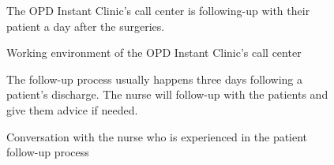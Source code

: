 \documentclass[12pt,oneside,openright,a4paper]{cpe-english-project}
\begin{document}
      \begin{figure}[!h]
        \centering
        \caption{Working environment of the OPD Instant Clinic's call center}\label{fig:Interview_2}
        \begin{flushleft}
          \qquad The OPD Instant Clinic's call center is following-up with their patient a day after the surgeries. \par
        \end{flushleft}
      \end{figure}
      \begin{figure}
        \centering
        \caption{Conversation with the nurse who is experienced in the patient follow-up process}\label{fig:Interview_3}
        \begin{flushleft}
          \qquad The follow-up process usually happens three days following a patient's discharge. The nurse will follow-up with the patients and give them advice if needed. \par
        \end{flushleft}
      \end{figure}
\end{document}
